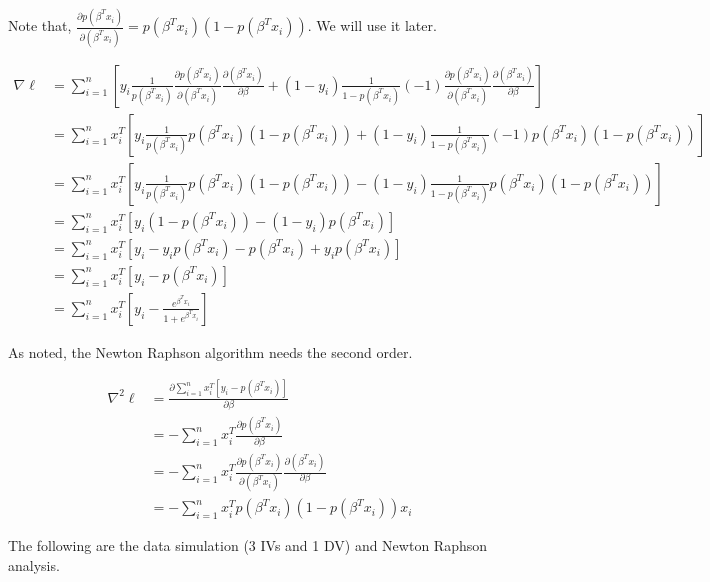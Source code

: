\documentclass[]{book}
\begin{document}
Note that,
\(\frac{\partial p(\beta ^T x_i)}{\partial (\beta ^T x_i)} = p(\beta ^T x_i)(1-p(\beta ^T x_i))\).
We will use it later.

\[\begin{aligned}
\nabla \ell &= \sum_{i=1}^{n} [y_i \frac{1}{p(\beta ^T x_i)} \frac{\partial p(\beta ^T x_i)}{\partial (\beta ^T x_i)}\frac{\partial (\beta ^T x_i)}{\partial \beta}+(1-y_i) \frac{1}{1-p(\beta ^T x_i)}(-1)\frac{\partial p(\beta ^T x_i)}{\partial (\beta ^T x_i)}\frac{\partial (\beta ^T x_i)}{\partial \beta}] \\
&= \sum_{i=1}^{n} x_i^T[y_i \frac{1}{p(\beta ^T x_i)} p(\beta ^T x_i)(1-p(\beta ^T x_i))+(1-y_i) \frac{1}{1-p(\beta ^T x_i)}(-1)p(\beta ^T x_i)(1-p(\beta ^T x_i))] \\
&= \sum_{i=1}^{n} x_i^T[y_i \frac{1}{p(\beta ^T x_i)} p(\beta ^T x_i)(1-p(\beta ^T x_i))-(1-y_i) \frac{1}{1-p(\beta ^T x_i)}p(\beta ^T x_i)(1-p(\beta ^T x_i))] \\
&= \sum_{i=1}^{n} x_i^T[y_i (1-p(\beta ^T x_i))-(1-y_i) p(\beta ^T x_i)] \\
&=\sum_{i=1}^{n} x_i^T[y_i-y_ip(\beta ^T x_i)-p(\beta ^T x_i)+y_i p(\beta ^T x_i)] \\
&=\sum_{i=1}^{n} x_i^T[y_i-p(\beta ^T x_i)] \\
&= \sum_{i=1}^{n} x_i^T[y_i-\frac{e^{\beta^Tx_i}}{1+e^{\beta^Tx_i}}]
\end{aligned}\]

As noted, the Newton Raphson algorithm needs the second order.

\[\begin{aligned}
\nabla^2 \ell &=\frac{\partial \sum_{i=1}^{n} x_i^T[y_i-p(\beta ^T x_i)]}{\partial \beta} \\
&=-\sum_{i=1}^{n} x_i^T\frac{\partial p(\beta ^T x_i) }{\partial \beta}\\
&=-\sum_{i=1}^{n} x_i^T\frac{\partial p(\beta ^T x_i) }{\partial (\beta^Tx_i)} \frac{\partial (\beta^Tx_i)}{\partial \beta}\\
&=-\sum_{i=1}^{n} x_i^T p(\beta ^T x_i)(1-p(\beta ^T x_i))x_i
\end{aligned}\]

The following are the data simulation (3 IVs and 1 DV) and Newton
Raphson analysis.
\end{document}
